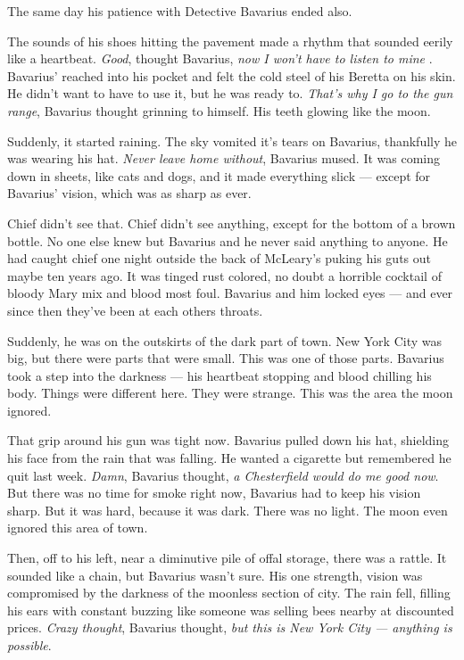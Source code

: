 The same day his patience with Detective Bavarius ended also.



The sounds of his shoes hitting the pavement made a rhythm that
sounded eerily like a heartbeat. {\em Good}, thought Bavarius,
{\em now I won't have to listen to mine} . Bavarius' reached into
his pocket and felt the cold steel of his Beretta on his skin. He
didn't want to have to use it, but he was ready to. {\em That's why I
go to the gun range}, Bavarius thought grinning to himself. His
teeth glowing like the moon.



Suddenly, it started raining. The sky vomited it's tears on
Bavarius, thankfully he was wearing his hat. {\em Never leave home
without}, Bavarius mused. It was coming down in sheets, like
cats and dogs, and it made everything slick --- except for
Bavarius' vision, which was as sharp as ever.



Chief didn't see that. Chief didn't see anything, except for the
bottom of a brown bottle. No one else knew but Bavarius and he
never said anything to anyone. He had caught chief one night
outside the back of McLeary's puking his guts out maybe ten years
ago. It was tinged rust colored, no doubt a horrible cocktail of
bloody Mary mix and blood most foul. Bavarius and him locked eyes
--- and ever since then they've been at each others
throats.



Suddenly, he was on the outskirts of the dark part of town. New
York City was big, but there were parts that were small. This was
one of those parts. Bavarius took a step into the darkness ---
his heartbeat stopping and blood chilling his body. Things were
different here. They were strange. This was the area the moon
ignored.



That grip around his gun was tight now. Bavarius pulled down his
hat, shielding his face from the rain that was falling. He wanted a
cigarette but remembered he quit last week. {\em Damn}, Bavarius
thought, {\em a Chesterfield would do me good now}. But there was
no time for smoke right now, Bavarius had to keep his vision sharp.
But it was hard, because it was dark. There was no light. The moon
even ignored this area of town.



Then, off to his left, near a diminutive pile of offal storage,
there was a rattle. It sounded like a chain, but Bavarius wasn't
sure. His one strength, vision was compromised by the darkness of
the moonless section of city. The rain fell, filling his ears with
constant buzzing like someone was selling bees nearby at discounted
prices. {\em Crazy thought}, Bavarius thought, {\em but this is New
York City --- anything is possible}.



